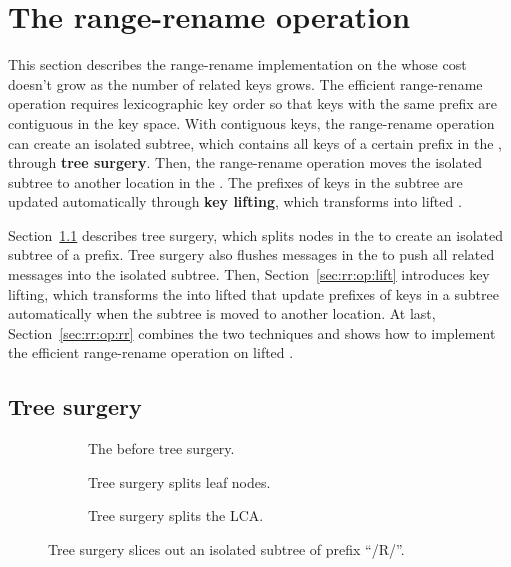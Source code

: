 \section{The range-rename operation}
\label{sec:rr:op}

This section describes the range-rename implementation on the
\bet whose cost doesn't grow as the number of related keys grows.
The efficient range-rename operation requires lexicographic key order so that
keys with the same prefix are contiguous in the key space.
With contiguous keys, the range-rename operation can create an isolated subtree,
which contains all keys of a certain prefix in the \bet,
through \textbf{tree surgery}.
Then, the range-rename operation moves the isolated subtree to another location
in the \bet.
The prefixes of keys in the subtree are updated automatically through
\textbf{key lifting}, which transforms \bets into lifted \bets.

Section~\ref{sec:rr:op:surgery} describes tree surgery, which splits nodes in the
\bet to create an isolated subtree of a prefix.
Tree surgery also flushes messages in the \bet to push all related messages into
the isolated subtree.
Then, Section~\ref{sec:rr:op:lift} introduces key lifting, which transforms the
\bets into lifted \bets that update prefixes of keys in a subtree
automatically when the subtree is moved to another location.
At last, Section~\ref{sec:rr:op:rr} combines the two techniques and shows how
to implement the efficient range-rename operation on lifted \bets.

\subsection{Tree surgery}
\label{sec:rr:op:surgery}

\begin{figure}
    \begin{subfigure}{\textwidth}
        \centering
        
        \caption{\label{subfig:slice-1} The \bet before tree surgery.}
    \end{subfigure}
    \begin{subfigure}{\textwidth}
        \centering
        
        \caption{\label{subfig:slice-2} Tree surgery splits leaf nodes.}
    \end{subfigure}
    \begin{subfigure}{\textwidth}
        \centering
        
        \caption{\label{subfig:slice-3} Tree surgery splits the LCA.}
    \end{subfigure}
    \caption[A tree surgery example]{\label{fig:slice}
        Tree surgery slices out an isolated subtree of prefix ``/R/''.}
\end{figure}

